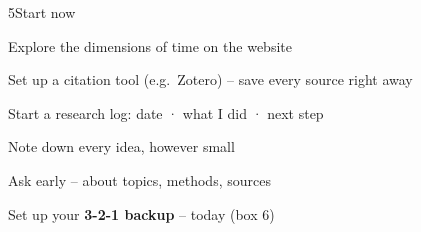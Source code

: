 \begin{wsbox}{5}{Start now}
\begin{minipage}[t]{0.49\linewidth}\vspace{0pt}
\cb Explore the dimensions of time on the website\par\vspace{0.6mm}
\cb Set up a citation tool (e.g.\ Zotero) – save every source right away\par\vspace{0.6mm}
\cb Start a research log: date · what I did · next step
\end{minipage}\hfill
\begin{minipage}[t]{0.49\linewidth}\vspace{0pt}
\cb Note down every idea, however small\par\vspace{0.6mm}
\cb Ask early – about topics, methods, sources\par\vspace{0.6mm}
\cb Set up your \textbf{3-2-1 backup} – today (box 6)
\end{minipage}
\end{wsbox}

